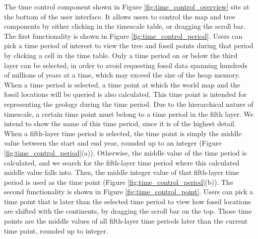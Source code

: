 \documentclass[11pt, a4paper,oneside,chapterprefix=false]{scrbook}
\begin{document}
The time control component shown in Figure \ref{fig:time_control_overview} sits at the bottom of the user interface. It allows users to control the map and tree components by either clicking in the timescale table, or dragging the scroll bar. The first functionality is shown in Figure \ref{fig:time_control_period}. Users can pick a time period of interest to view the tree and fossil points during that period by clicking a cell in the time table. Only a time period on or below the third layer can be selected, in order to avoid requesting fossil data spanning hundreds of millions of years at a time, which may exceed the size of the heap memory. When a time period is selected, a time point at which the world map and the fossil locations will be queried is also calculated. This time point is intended for representing the geology during the time period. Due to the hierarchical nature of timescale, a certain time point must belong to a time period in the fifth layer. We intend to show the name of this time period, since it is of the highest detail. When a fifth-layer time period is selected, the time point is simply the middle value between the start and end year, rounded up to an integer (Figure \ref{fig:time_control_period}(a)). Otherwise, the middle value of the time period is calculated, and we search for the fifth-layer time period where this calculated middle value falls into. Then, the middle integer value of that fifth-layer time period is used as the time point (Figure \ref{fig:time_control_period}(b)). The second functionality is shown in Figure \ref{fig:time_control_point}. Users can pick a time point that is later than the selected time period to view how fossil locations are shifted with the continents, by dragging the scroll bar on the top. Those time points are the middle values of all fifth-layer time periods later than the current time point, rounded up to integer. \\
\end{document}
